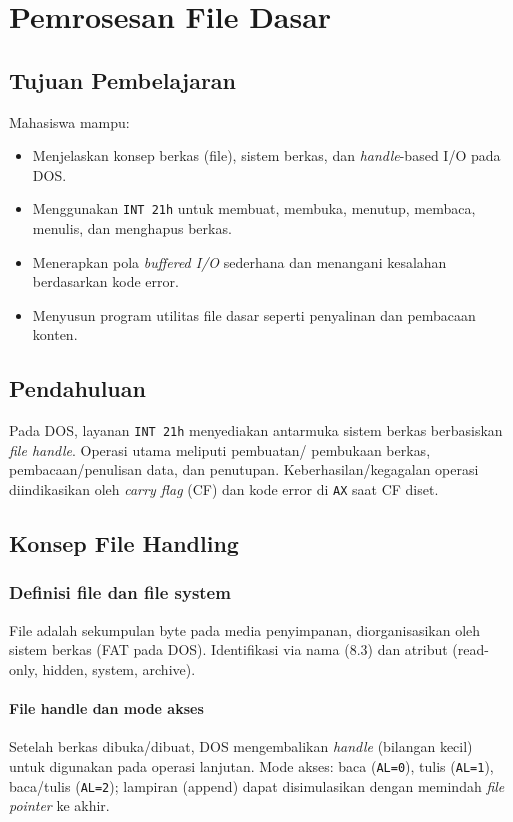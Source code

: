 \chapter{Pemrosesan File Dasar}

\section{Tujuan Pembelajaran}
Mahasiswa mampu:
\begin{itemize}
    \item Menjelaskan konsep berkas (file), sistem berkas, dan \textit{handle}-based I/O pada DOS.
    \item Menggunakan \texttt{INT 21h} untuk membuat, membuka, menutup, membaca, menulis, dan menghapus berkas.
    \item Menerapkan pola \textit{buffered I/O} sederhana dan menangani kesalahan berdasarkan kode error.
    \item Menyusun program utilitas file dasar seperti penyalinan dan pembacaan konten.
\end{itemize}

\section{Pendahuluan}
Pada DOS, layanan \texttt{INT 21h} menyediakan antarmuka sistem berkas berbasiskan \textit{file handle}. Operasi utama meliputi pembuatan/ pembukaan berkas, pembacaan/penulisan data, dan penutupan. Keberhasilan/kegagalan operasi diindikasikan oleh \textit{carry flag} (CF) dan kode error di \texttt{AX} saat CF diset.

\section{Konsep File Handling}
\subsection{Definisi file dan file system}
File adalah sekumpulan byte pada media penyimpanan, diorganisasikan oleh sistem berkas (FAT pada DOS). Identifikasi via nama (8.3) dan atribut (read-only, hidden, system, archive).

\subsubsection{File handle dan mode akses}
Setelah berkas dibuka/dibuat, DOS mengembalikan \textit{handle} (bilangan kecil) untuk digunakan pada operasi lanjutan. Mode akses: baca (\texttt{AL=0}), tulis (\texttt{AL=1}), baca/tulis (\texttt{AL=2}); lampiran (append) dapat disimulasikan dengan memindah \textit{file pointer} ke akhir.

